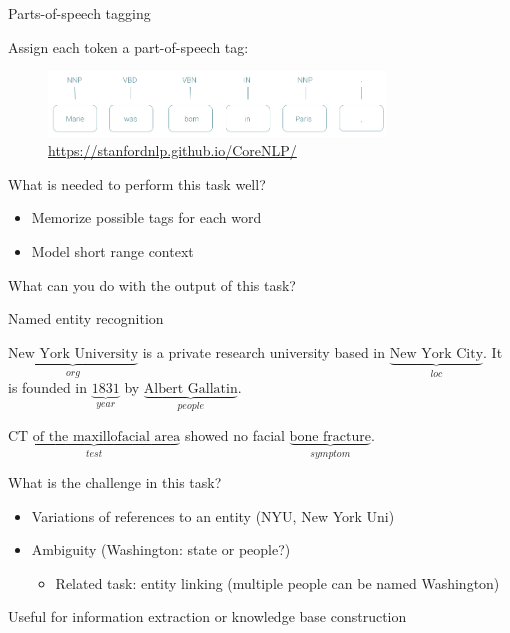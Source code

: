 \documentclass[usenames,dvipsnames,notes,11pt,aspectratio=169,hyperref={colorlinks=true, linkcolor=blue}]{beamer}
\newcommand{\pdfnote}[1]{}
\begin{document}
\begin{frame}
    {Parts-of-speech tagging}

    Assign each token a part-of-speech tag:
    \begin{figure}
        \includegraphics[width=0.8\textwidth]{figures/pos}
        \caption{\url{https://stanfordnlp.github.io/CoreNLP/}}
    \end{figure}

    What is needed to perform this task well?\\\pause
    \begin{itemize}
        \item Memorize possible tags for each word
        \item Model short range context
    \end{itemize}

    What can you do with the output of this task?\pause
    \pdfnote{
        As features of text styles, lemmatization
    }
\end{frame}

\begin{frame}
    {Named entity recognition}

        {
            $\underbrace{\text{New York University}}_{{\textstyle org}}$ is a private research university based in $\underbrace{\text{New York City}}_{{\textstyle loc}}$.
            It is founded in $\underbrace{\text{1831}}_{{\textstyle year}}$ by $\underbrace{\text{Albert Gallatin}}_{{\textstyle people}}$.\par
            \pause
            $\underbrace{\text{CT of the maxillofacial area}}_{{\textstyle test}}$ showed no facial $\underbrace{\text{bone fracture}}_{{\textstyle symptom}}$.\par
        }

        What is the challenge in this task?\\\pause
        \begin{itemize}
            \item Variations of references to an entity (NYU, New York Uni)
            \item Ambiguity (Washington: state or people?)
                \begin{itemize}
            \item Related task: entity linking (multiple people can be named Washington)
                \end{itemize}
        \end{itemize}

        \pause\medskip
        Useful for information extraction or knowledge base construction
\end{frame}
\end{document}
